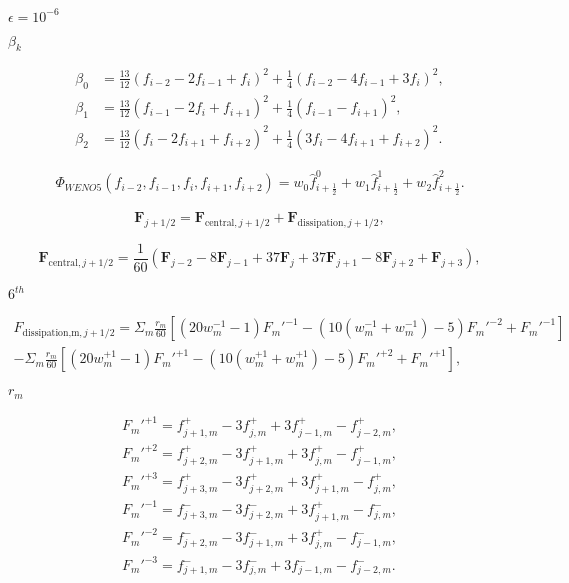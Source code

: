 \documentclass{article}
\begin{document}
$\epsilon = 10^{-6}$
\pagebreak

$\beta_{k}$
\pagebreak

\[ \begin{align*} \beta_{0} &= \frac{13}{12}(f_{i-2}-2f_{i-1}+f_{i})^{2} + \frac{1}{4}(f_{i-2}-4f_{i-1}+3f_{i})^{2}, \\ \beta_{1} &= \frac{13}{12}(f_{i-1}-2f_{i}+f_{i+1})^{2} + \frac{1}{4}(f_{i-1}-f_{i+1})^{2}, \\ \beta_{2} &= \frac{13}{12}(f_{i}-2f_{i+1}+f_{i+2})^{2} + \frac{1}{4}(3f_{i}-4f_{i+1}+f_{i+2})^{2}. \end{align*} \]
\pagebreak

\[ \begin{align*} \Phi_{WENO5}(f_{i-2},f_{i-1},f_{i},f_{i+1},f_{i+2}) = w_{0}\hat{f}_{i+\frac{1}{2}}^{0} + w_{1}\hat{f}_{i+\frac{1}{2}}^{1} + w_{2}\hat{f}_{i+\frac{1}{2}}^{2}. \end{align*} \]
\pagebreak

\[ \begin{equation*} \mathbf{F}_{j+1/2}=\mathbf{F}_{\textrm{central},j+1/2}+\mathbf{F}_{\textrm{dissipation},j+1/2}, \end{equation*} \]
\pagebreak

\[ \begin{equation*} \mathbf{F}_{\textrm{central},j+1/2}=\frac{1}{60}\left(\mathbf{F}_{j-2}-8\mathbf{F}_{j-1}+37\mathbf{F}_j+37\mathbf{F}_{j+1}-8\mathbf{F}_{j+2}+\mathbf{F}_{j+3}\right), \end{equation*} \]
\pagebreak

$6^{th}$
\pagebreak

\[ \begin{align*} F_{\textrm{dissipation,m},j+1/2}=\Sigma_m \frac{r_m}{60}\left[(20 w_m^{-1} -1) F_m'^{-1} -(10(w_m^{-1}+w_m^{-1})-5) F_m'^{-2}+F_m'^{-1}\right]\\ -\Sigma_m \frac{r_m}{60}\left[(20 w_m^{+1} -1) F_m'^{+1} -(10(w_m^{+1}+w_m^{+1})-5) F_m'^{+2}+F_m'^{+1}\right], \end{align*} \]
\pagebreak

$r_m$
\pagebreak

\[ \begin{align*} F_m'^{+1}= f_{j+1,m}^{+}-3 f_{j,m}^{+}+3 f_{j-1,m}^{+}-f_{j-2,m}^{+},\\ F_m'^{+2}= f_{j+2,m}^{+}-3 f_{j+1,m}^{+}+3 f_{j,m}^{+}-f_{j-1,m}^{+},\\ F_m'^{+3}= f_{j+3,m}^{+}-3 f_{j+2,m}^{+}+3 f_{j+1,m}^{+}-f_{j,m}^{+},\\ F_m'^{-1}= f_{j+3,m}^{-}-3 f_{j+2,m}^{-}+3 f_{j+1,m}^{+}-f_{j,m}^{-},\\ F_m'^{-2}= f_{j+2,m}^{-}-3 f_{j+1,m}^{-}+3 f_{j,m}^{+}-f_{j-1,m}^{-},\\ F_m'^{-3}= f_{j+1,m}^{-}-3 f_{j,m}^{-}+3 f_{j-1,m}^{-}-f_{j-2,m}^{-}. \end{align*} \]
\pagebreak
\end{document}
